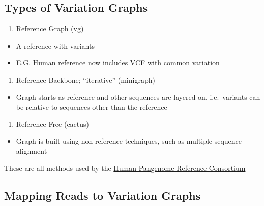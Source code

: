 \documentclass[
]{book}
\providecommand{\tightlist}{%
  \setlength{\itemsep}{0pt}\setlength{\parskip}{0pt}}
\begin{document}
\hypertarget{types-of-variation-graphs}{%
\subsection{Types of Variation Graphs}\label{types-of-variation-graphs}}

\begin{enumerate}
\def\labelenumi{\arabic{enumi}.}
\tightlist
\item
  Reference Graph (vg)
\end{enumerate}

\begin{itemize}
\tightlist
\item
  A reference with variants
\item
  E.G. \href{https://www.ncbi.nlm.nih.gov/genome/guide/human/}{Human reference now includes VCF with common variation}
\end{itemize}

\begin{enumerate}
\def\labelenumi{\arabic{enumi}.}
\setcounter{enumi}{1}
\tightlist
\item
  Reference Backbone; ``iterative'' (minigraph)
\end{enumerate}

\begin{itemize}
\tightlist
\item
  Graph starts as reference and other sequences are layered
  on, i.e.~variants can be relative to sequences other than the
  reference
\end{itemize}

\begin{enumerate}
\def\labelenumi{\arabic{enumi}.}
\setcounter{enumi}{2}
\tightlist
\item
  Reference-Free (cactus)
\end{enumerate}

\begin{itemize}
\tightlist
\item
  Graph is built using non-reference techniques, such as multiple sequence alignment
\end{itemize}

These are all methods used by the \href{https://humanpangenome.org}{Human Pangenome Reference Consortium}

\hypertarget{mapping-reads-to-variation-graphs}{%
\subsection{Mapping Reads to Variation Graphs}\label{mapping-reads-to-variation-graphs}}
\end{document}
